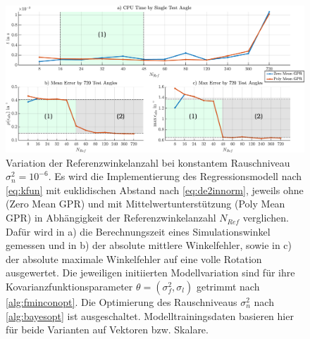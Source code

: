 \clearpage
\begin{landscape}
\begin{figure}[tbph]
	\centering
	\includegraphics[width=\linewidth]{chapters/images/4-EuOExp/Timings-vs-Errors}
	\caption[Variation der Referenzwinkelanzahl bei konstantem Rauschniveau]{Variation der Referenzwinkelanzahl bei konstantem Rauschniveau $\sigma_n^2 = 10^{-6}$. Es wird die Implementierung des Regressionsmodell nach \autoref{eq:kfun} mit euklidischen Abstand nach \autoref{eq:de2innorm}, jeweils ohne (Zero Mean GPR) und mit Mittelwertunterstützung (Poly Mean GPR) in Abhängigkeit der Referenzwinkelanzahl $N_{Ref}$ verglichen. Dafür wird in a) die Berechnungszeit eines Simulationswinkel gemessen und in b) der absolute mittlere Winkelfehler, sowie in c) der absolute maximale Winkelfehler auf eine volle Rotation ausgewertet. Die jeweiligen initiierten Modellvariation sind für ihre Kovarianzfunktionsparameter $\theta = (\sigma_f^2,\sigma_l)$ getrimmt nach \autoref{alg:fminconopt}. Die Optimierung des Rauschniveaus $\sigma_n^2$ nach \autoref{alg:bayesopt} ist ausgeschaltet. Modelltrainingsdaten basieren hier für beide Varianten auf Vektoren bzw. Skalare.}
	\label{fig:timings-vs-errors}
\end{figure}
\end{landscape}


\clearpage

